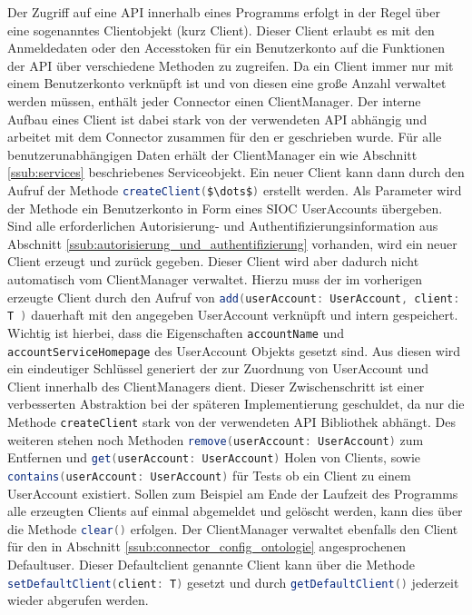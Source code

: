 Der Zugriff auf eine API innerhalb eines Programms erfolgt in der Regel über eine sogenanntes Clientobjekt (kurz Client). Dieser Client erlaubt es mit den Anmeldedaten oder den Accesstoken für ein Benutzerkonto auf die Funktionen der API über verschiedene Methoden zu zugreifen. Da ein Client immer nur mit einem Benutzerkonto verknüpft ist und von diesen eine große Anzahl verwaltet werden müssen, enthält jeder Connector einen ClientManager. Der interne Aufbau eines Client ist dabei stark von der verwendeten API abhängig und arbeitet mit dem Connector zusammen für den er geschrieben wurde. Für alle benutzerunabhängigen Daten erhält der ClientManager ein wie Abschnitt \ref{ssub:services} beschriebenes Serviceobjekt. Ein neuer Client kann dann durch den Aufruf der Methode \lstinline[language=java]{createClient($\dots$)} erstellt werden. Als Parameter wird der Methode ein Benutzerkonto in Form eines SIOC UserAccounts übergeben. Sind alle erforderlichen Autorisierung- und Authentifizierungsinformation aus Abschnitt \ref{ssub:autorisierung_und_authentifizierung} vorhanden, wird ein neuer Client erzeugt und zurück gegeben. Dieser Client wird aber dadurch nicht automatisch vom ClientManager verwaltet. Hierzu muss der im vorherigen erzeugte Client durch den Aufruf von \lstinline[language=java]{add(userAccount: UserAccount, client: T )} dauerhaft mit den angegeben UserAccount verknüpft und intern gespeichert. Wichtig ist hierbei, dass die Eigenschaften \texttt{accountName} und \texttt{accountServiceHomepage} des UserAccount Objekts gesetzt sind. Aus diesen wird ein eindeutiger Schlüssel generiert der zur Zuordnung von UserAccount und Client innerhalb des ClientManagers dient. Dieser Zwischenschritt ist einer verbesserten Abstraktion bei der späteren Implementierung geschuldet, da nur die Methode \lstinline[language=java]{createClient} stark von der verwendeten API Bibliothek abhängt. Des weiteren stehen noch Methoden \lstinline[language=java]{remove(userAccount: UserAccount)} zum Entfernen und \lstinline[language=java]{get(userAccount: UserAccount)} Holen von Clients, sowie \lstinline[language=java]{contains(userAccount: UserAccount)} für Tests ob ein Client zu einem UserAccount existiert. Sollen zum Beispiel am Ende der Laufzeit des Programms alle erzeugten Clients auf einmal abgemeldet und gelöscht werden, kann dies über die Methode \lstinline[language=java]{clear()} erfolgen. Der ClientManager verwaltet ebenfalls den Client für den in Abschnitt \ref{ssub:connector_config_ontologie} angesprochenen Defaultuser. Dieser Defaultclient genannte Client kann über die Methode  \lstinline[language=java]{setDefaultClient(client: T)} gesetzt und durch \lstinline[language=java]{getDefaultClient()} jederzeit wieder abgerufen werden. 

